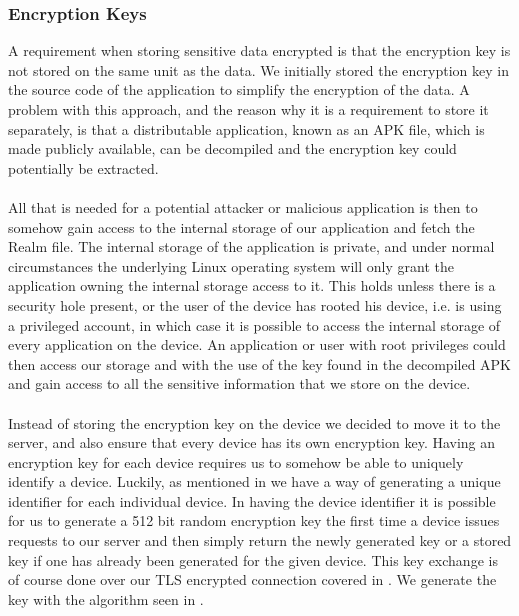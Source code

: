 \subsubsection{Encryption Keys}
\label{sub:encryption_keys}
A requirement when storing sensitive data encrypted is that the encryption key is not stored on the same unit as the data. We initially stored the encryption key in the source code of the application to simplify the encryption of the data. A problem with this approach, and the reason why it is a requirement to store it separately, is that a distributable application, known as an APK file, which is made publicly available, can be decompiled and the encryption key could potentially be extracted. 
\\\\
All that is needed for a potential attacker or malicious application is then to somehow gain access to the internal storage of our application and fetch the Realm file. The internal storage of the application is private, and under normal circumstances the underlying Linux operating system will only grant the application owning the internal storage access to it. This holds unless there is a security hole present, or the user of the device has rooted his device, i.e. is using a privileged account, in which case it is possible to access the internal storage of every application on the device. An application or user with root privileges could then access our storage and with the use of the key found in the decompiled APK and gain access to all the sensitive information that we store on the device.
\\\\
Instead of storing the encryption key on the device we decided to move it to the server, and also ensure that every device has its own encryption key. Having an encryption key for each device requires us to somehow be able to uniquely identify a device. Luckily, as mentioned in  we have a way of generating a unique identifier for each individual device. In having the device identifier it is possible for us to generate a 512 bit random encryption key the first time a device issues requests to our server and then simply return the newly generated key or a stored key if one has already been generated for the given device. This key exchange is of course done over our TLS encrypted connection covered in . We generate the key with the algorithm seen in . 


\FloatBarrier

